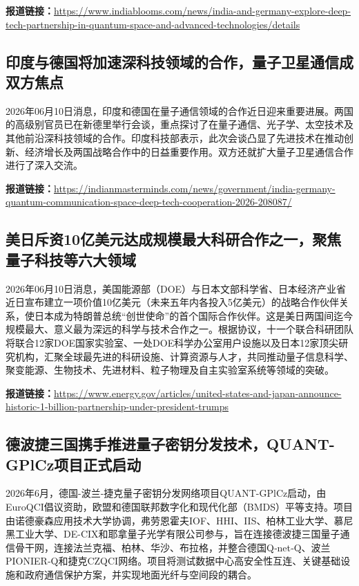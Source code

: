 \documentclass[12pt,a4paper]{ctexart}
\begin{document}
\noindent\textbf{报道链接：}\url{https://www.indiablooms.com/news/india-and-germany-explore-deep-tech-partnership-in-quantum-space-and-advanced-technologies/details}

\subsection{ 印度与德国将加速深科技领域的合作，量子卫星通信成双方焦点 }

2026年06月10日消息，印度和德国在量子通信领域的合作近日迎来重要进展。两国的高级别官员已在新德里举行会谈，重点探讨了在量子通信、光子学、太空技术及其他前沿深科技领域的合作。印度科技部表示，此次会谈凸显了先进技术在推动创新、经济增长及两国战略合作中的日益重要作用。双方还就扩大量子卫星通信合作进行了深入交流。

\noindent\textbf{报道链接：}\url{https://indianmasterminds.com/news/government/india-germany-quantum-communication-space-deep-tech-cooperation-2026-208087/}

\subsection{ 美日斥资10亿美元达成规模最大科研合作之一，聚焦量子科技等六大领域 }

2026年06月10日消息，美国能源部（DOE）与日本文部科学省、日本经济产业省近日宣布建立一项价值10亿美元（未来五年内各投入5亿美元）的战略合作伙伴关系，使日本成为特朗普总统“创世使命”的首个国际合作伙伴。这是美日两国间迄今规模最大、意义最为深远的科学与技术合作之一。根据协议，十一个联合科研团队将联合12家DOE国家实验室、一处DOE科学办公室用户设施以及日本12家顶尖研究机构，汇聚全球最先进的科研设施、计算资源与人才，共同推动量子信息科学、聚变能源、生物技术、先进材料、粒子物理及自主实验室系统等领域的突破。

\noindent\textbf{报道链接：}\url{https://www.energy.gov/articles/united-states-and-japan-announce-historic-1-billion-partnership-under-president-trumps}

\subsection{ 德波捷三国携手推进量子密钥分发技术，QUANT-GPlCz项目正式启动 }

2026年6月，德国-波兰-捷克量子密钥分发网络项目QUANT-GPlCz启动，由EuroQCI倡议资助，欧盟和德国联邦数字化和现代化部（BMDS）平等支持。项目由诺德豪森应用技术大学协调，弗劳恩霍夫IOF、HHI、IIS、柏林工业大学、慕尼黑工业大学、DE-CIX和耶拿量子光学有限公司参与，旨在连接德波捷三国量子通信骨干网，连接法兰克福、柏林、华沙、布拉格，并整合德国Q‑net‑Q、波兰PIONIER‑Q和捷克CZQCI网络。项目将测试数据中心高安全性互连、关键基础设施和政府通信保护方案，并实现地面光纤与空间段的耦合。
\end{document}

